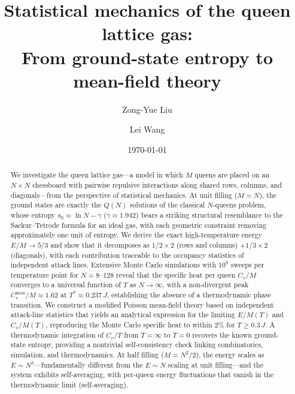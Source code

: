 \documentclass[aps, pre, reprint, amsmath, amssymb, superscriptaddress, floatfix]{revtex4-2}
\begin{document}
\title{Statistical mechanics of the queen lattice gas:\\
From ground-state entropy to mean-field theory}

\author{Zong-Yue Liu}

\author{Lei Wang}

\date{\today}

\begin{abstract}
We investigate the queen lattice gas---a model in which $M$ queens
are placed on an $N \times N$ chessboard with pairwise repulsive
interactions along shared rows, columns, and diagonals---from the
perspective of statistical mechanics.  At unit filling ($M = N$), the
ground states are exactly the $Q(N)$ solutions of the classical
$N$-queens problem, whose entropy $s_0 \approx \ln N - \gamma$
($\gamma \approx 1.942$) bears a striking structural resemblance to
the Sackur--Tetrode formula for an ideal gas, with each geometric
constraint removing approximately one unit of entropy.  We derive the
exact high-temperature energy $E/M \to 5/3$ and show that it
decomposes as $1/2 \times 2$ (rows and columns)
$+ 1/3 \times 2$ (diagonals), with each contribution traceable to
the occupancy statistics of independent attack lines.  Extensive
Monte Carlo simulations with $10^8$ sweeps per temperature point for
$N = 8$--$128$ reveal that the specific heat per queen $C_v/M$
converges to a universal function of $T$ as $N \to \infty$, with a
non-divergent peak $C_v^{\max}/M \approx 1.62$ at
$T^* \approx 0.237\,J$, establishing the absence of a thermodynamic
phase transition.  We construct a modified Poisson mean-field theory
based on independent attack-line statistics that yields an analytical
expression for the limiting $E/M(T)$ and $C_v/M(T)$, reproducing
the Monte Carlo specific heat to within $2\%$ for $T \ge 0.3\,J$.
A thermodynamic integration of $C_v/T$ from $T = \infty$ to $T = 0$
recovers the known ground-state entropy, providing a nontrivial
self-consistency check linking combinatorics, simulation, and
thermodynamics.  At half filling ($M = N^2/2$), the energy scales as
$E \sim N^3$---fundamentally different from the $E \sim N$
scaling at unit filling---and the system exhibits self-averaging,
with per-queen energy fluctuations that vanish in the
thermodynamic limit (self-averaging).
\end{abstract}

\maketitle
\end{document}
